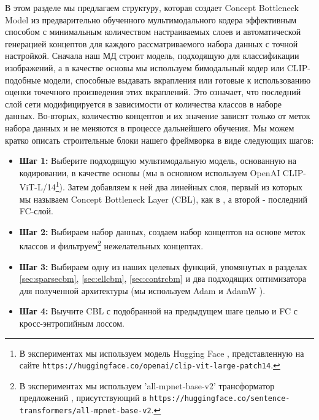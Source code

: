 В этом разделе мы предлагаем структуру, которая создает
Concept Bottleneck Model из предварительно обученного мультимодального кодера эффективным способом с минимальным количеством настраиваемых слоев и автоматической генерацией концептов для каждого рассматриваемого набора данных с точной настройкой. Сначала наш МД строит модель, подходящую для классификации изображений, а в качестве основы мы используем бимодальный кодер или CLIP-подобные модели, способные выдавать вкрапления или готовые к использованию оценки точечного произведения этих вкраплений. Это означает, что последний слой сети модифицируется в зависимости от количества классов в наборе данных. Во-вторых, количество концептов и их значение зависят только от меток набора данных и не меняются в процессе дальнейшего обучения. Мы можем кратко описать строительные блоки нашего фреймворка в виде следующих шагов:
\begin{itemize}
\item \textbf{Шаг 1:} Выберите подходящую мультимодальную модель, основанную на кодировании, в качестве основы (мы в основном используем OpenAI CLIP-ViT-L/14\footnote{В экспериментах мы используем модель Hugging Face \cite{wolf2020huggingfaces}, представленную на сайте \texttt{https://huggingface.co/openai/clip-vit-large-patch14}.}). Затем добавляем к ней два линейных слоя, первый из которых мы называем Concept Bottleneck Layer (CBL), как в \cite{oikarinen2023labelfree}, а второй - последний FC-слой.
\item \textbf{Шаг 2:} Выбираем набор данных, создаем набор концептов на основе меток классов и фильтруем\footnote{В экспериментах мы используем 'all-mpnet-base-v2' трансформатор предложений \cite{reimers-2019-sentence-bert} \nocite{reimers-2020-multilingual-sentence-bert}, присутствующий в \texttt{https://huggingface.co/sentence-transformers/all-mpnet-base-v2}.} нежелательных концептах.  
\item \textbf{Шаг 3:} Выбираем одну из наших целевых функций, упомянутых в разделах \ref{sec:sparsecbm}, \ref{sec:ellcbm}, \ref{sec:contrcbm} и два подходящих оптимизатора для полученной архитектуры (мы используем Adam \cite{kingma2017adam} и AdamW \cite{loshchilov2019decoupled}).
\item \textbf{Шаг 4:} Выучите CBL с подобранной на предыдущем шаге целью и FC с кросс-энтропийным лоссом.
\end{itemize}
